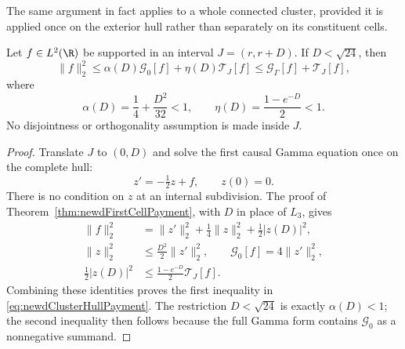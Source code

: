 The same argument in fact applies to a whole connected cluster, provided it
is applied once on the exterior hull rather than separately on its
constituent cells.

\begin{lemma}
\label{lem:newdClusterHull}
Let $f\in L^2(\R)$ be supported in an interval $J=(r,r+D)$.  If
$D<\sqrt{24}$, then
\begin{equation}\label{eq:newdClusterHullPayment}
 \|f\|_2^2
 \leq \alpha(D)\mathcal G_0[f]
       +\eta(D)\mathcal T_J[f]
 \leq \mathcal G_\Gamma[f]+\mathcal T_J[f],
\end{equation}
where
\begin{equation}\label{eq:newdClusterHullConstants}
 \alpha(D)=\frac14+\frac{D^2}{32}<1,
 \qquad
 \eta(D)=\frac{1-e^{-D}}2<1.
\end{equation}
No disjointness or orthogonality assumption is made inside $J$.
\end{lemma}

\begin{proof}
Translate $J$ to $(0,D)$ and solve the first causal Gamma equation once on
the complete hull:
\[
 z'=-\tfrac12z+f,
 \qquad z(0)=0.
\]
There is no condition on $z$ at an internal subdivision.  The proof of
Theorem~\ref{thm:newdFirstCellPayment}, with $D$ in place of $L_3$, gives
\begin{align*}
 \|f\|_2^2
 &=\|z'\|_2^2+\tfrac14\|z\|_2^2+\tfrac12|z(D)|^2,\\
 \|z\|_2^2&\leq\tfrac{D^2}{2}\|z'\|_2^2,
 \qquad
 \mathcal G_0[f]=4\|z'\|_2^2,\\
 \tfrac12|z(D)|^2
 &\leq\tfrac{1-e^{-D}}2\mathcal T_J[f].
\end{align*}
Combining these identities proves the first inequality in
\eqref{eq:newdClusterHullPayment}.  The restriction $D<\sqrt{24}$ is
exactly $\alpha(D)<1$; the second inequality then follows because the full
Gamma form contains $\mathcal G_0$ as a nonnegative summand.
\end{proof}


